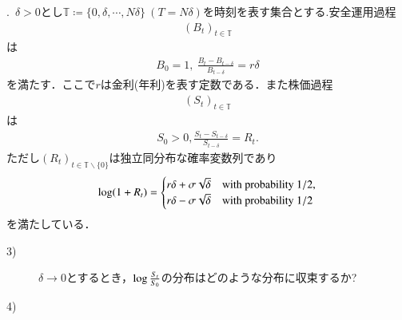 .\ $\delta > 0$とし$\mathbb{T} \coloneqq \{ 0 ,\delta, \cdots, N\delta \}\ (T = N\delta)$を時刻を表す集合とする.安全運用過程
\begin{align}
	(B_t)_{t \in \mathbb{T}}
\end{align}
は
\begin{align}
	B_0 = 1,\ \frac{B_t - B_{t - \delta}}{B_{t - \delta}} = r \delta
\end{align}
を満たす．ここで$r$は金利(年利)を表す定数である．また株価過程
\begin{align}
	(S_t)_{t \in \mathbb{T}}
\end{align}
は
\begin{align}
	S_0 > 0, \frac{S_t - S_{t - \delta}}{S_{t - \delta}} = R_t.
\end{align}
ただし$(R_t)_{t \in \mathbb{T} \backslash \{0\}}$は独立同分布な確率変数列であり
\begin{align}
	\operatorname{log} (1 + R_t) = \begin{cases}
		r \delta + \sigma \sqrt{\delta} & \mbox{with probability } 1/2, \\
		r \delta - \sigma \sqrt{\delta} & \mbox{with probability } 1/2
	\end{cases}
\end{align} 
を満たしている．
\begin{description}
	\item[3)] $\delta \rightarrow 0$とするとき，$\operatorname{log} \frac{S_t}{S_0}$の分布はどのような分布に収束するか?
	\item[4)] 
\end{description}

